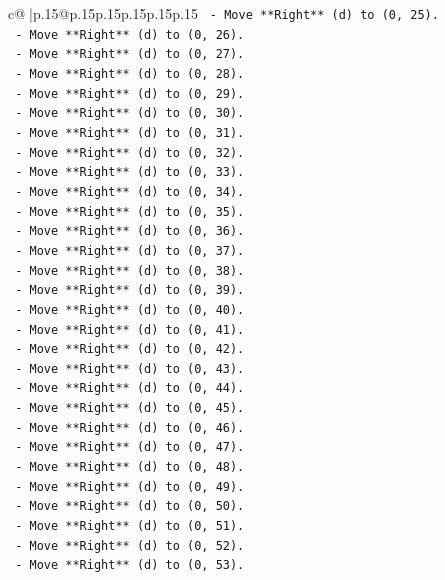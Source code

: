 \documentclass{article}
\begin{document}
{\begin{supertabular}{c@{$\;$}|p{.15\linewidth}@{}p{.15\linewidth}p{.15\linewidth}p{.15\linewidth}p{.15\linewidth}p{.15\linewidth}}
{{{\texttt{    {-} Move **Right** (d) to (0, 25).} \\
\texttt{    {-} Move **Right** (d) to (0, 26).} \\
\texttt{    {-} Move **Right** (d) to (0, 27).} \\
\texttt{    {-} Move **Right** (d) to (0, 28).} \\
\texttt{    {-} Move **Right** (d) to (0, 29).} \\
\texttt{    {-} Move **Right** (d) to (0, 30).} \\
\texttt{    {-} Move **Right** (d) to (0, 31).} \\
\texttt{    {-} Move **Right** (d) to (0, 32).} \\
\texttt{    {-} Move **Right** (d) to (0, 33).} \\
\texttt{    {-} Move **Right** (d) to (0, 34).} \\
\texttt{    {-} Move **Right** (d) to (0, 35).} \\
\texttt{    {-} Move **Right** (d) to (0, 36).} \\
\texttt{    {-} Move **Right** (d) to (0, 37).} \\
\texttt{    {-} Move **Right** (d) to (0, 38).} \\
\texttt{    {-} Move **Right** (d) to (0, 39).} \\
\texttt{    {-} Move **Right** (d) to (0, 40).} \\
\texttt{    {-} Move **Right** (d) to (0, 41).} \\
\texttt{    {-} Move **Right** (d) to (0, 42).} \\
\texttt{    {-} Move **Right** (d) to (0, 43).} \\
\texttt{    {-} Move **Right** (d) to (0, 44).} \\
\texttt{    {-} Move **Right** (d) to (0, 45).} \\
\texttt{    {-} Move **Right** (d) to (0, 46).} \\
\texttt{    {-} Move **Right** (d) to (0, 47).} \\
\texttt{    {-} Move **Right** (d) to (0, 48).} \\
\texttt{    {-} Move **Right** (d) to (0, 49).} \\
\texttt{    {-} Move **Right** (d) to (0, 50).} \\
\texttt{    {-} Move **Right** (d) to (0, 51).} \\
\texttt{    {-} Move **Right** (d) to (0, 52).} \\
\texttt{    {-} Move **Right** (d) to (0, 53).} \\
}}}
\end{supertabular}}
\end{document}
